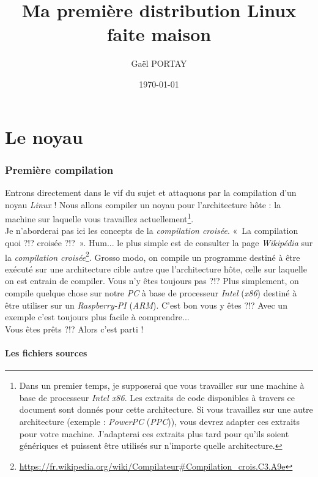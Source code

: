 \documentclass[a4paper]{article}
\title{Ma première distribution Linux faite maison}
\author{Gaël PORTAY}
\date{\today}
\begin{document}
\sloppy
\maketitle

\tableofcontents

\clearpage
\part{Le noyau}

\section{Première compilation}

Entrons directement dans le vif du sujet et attaquons par la compilation d'un noyau \textit{Linux} ! Nous allons compiler un noyau pour l'architecture hôte : la machine sur laquelle vous travaillez actuellement\footnote{Dans un premier temps, je supposerai que vous travailler sur une machine à base de processeur \textit{Intel x86}. Les extraits de code disponibles à travers ce document sont donnés pour cette architecture. Si vous travaillez sur une autre architecture (exemple : \textit{PowerPC} (\textit{PPC})), vous devrez adapter ces extraits pour votre machine. J'adapterai ces extraits plus tard pour qu'ils soient génériques et puissent être utilisés sur n'importe quelle architecture.}.\\

Je n'aborderai pas ici les concepts de la \textit{compilation croisée}. «~La compilation quoi ?!? croisée ?!?~». Hum... le plus simple est de consulter la page \textit{Wikipédia} sur la \textit{compilation croisée}\footnote{\url{https://fr.wikipedia.org/wiki/Compilateur\#Compilation\_crois.C3.A9e}}. Grosso modo, on compile un programme destiné à être exécuté sur une architecture cible autre que l'architecture hôte, celle sur laquelle on est entrain de compiler. Vous n'y êtes toujours pas ?!? Plus simplement, on compile quelque chose sur notre \textit{PC} à base de processeur \textit{Intel} (\textit{x86}) destiné à être utiliser sur un \textit{Raspberry-PI} (\textit{ARM}). C'est bon vous y êtes ?!? Avec un exemple c'est toujours plus facile à comprendre...\\

Vous êtes prêts ?!? Alors c'est parti !\\

\subsection{Les fichiers sources}
\end{document}
